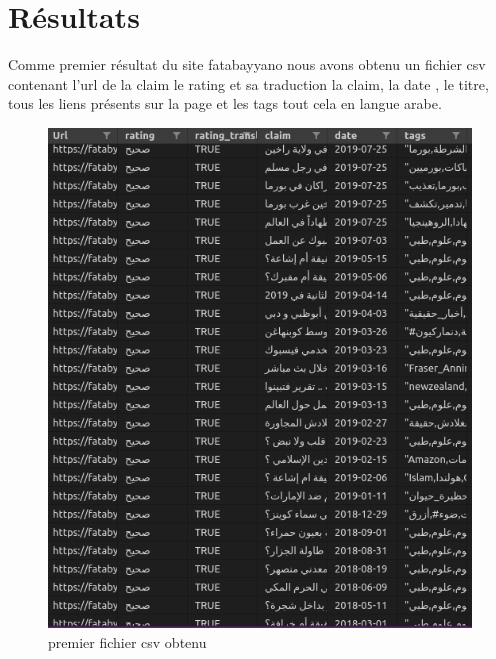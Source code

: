 \documentclass[oneside,13pt,a4paper]{report}
\begin{document}
\section{Résultats}
Comme premier résultat du site fatabayyano nous avons obtenu un fichier csv contenant l'url de la claim le rating et sa traduction la claim, la date , le titre, tous les liens présents sur la page et les tags tout cela en langue arabe.
\begin{figure}[h]
	\centering
	\begin{minipage}[c]{.5\linewidth}
\includegraphics[width=1\textwidth]{img/fatab1.png}
\caption{premier fichier csv obtenu}
	\end{minipage}
\end{figure}
\end{document}
